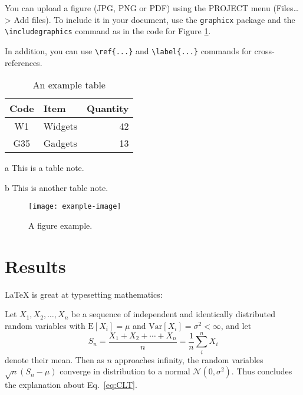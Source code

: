 \documentclass{biophys-new}
\begin{document}
You can upload a figure (JPG, PNG or PDF) using the PROJECT menu (Files\ldots > Add files). To include it in your document, use the \verb|graphicx| package and the \verb|\includegraphics| command as in the code for Figure \ref{fig:view}. 

In addition, you can use \verb|\ref{...}| and \verb|\label{...}| commands for cross-references.

\begin{table}[hbt!]
\caption{An example table}
\label{tab:widgets}
\centering

\begin{threeparttable}

\begin{tabular}{c l r}
\hline
Code & Item & Quantity \\\hline
W1 & Widgets\tnote{a} & 42 \\
G35 & Gadgets & 13\tnote{b} \\
\hline
\end{tabular}

\begin{tablenotes}
\item[a] This is a table note.
\item[b] This is another table note.
\end{tablenotes}

\end{threeparttable}

\end{table}

\begin{figure}[hbt!]
\centering
\texttt{[image: example-image]}
\caption{A figure example.}
\label{fig:view}

\end{figure}

\section*{Results}

\LaTeX{} is great at typesetting mathematics:

Let $X_1, X_2, \ldots, X_n$ be a sequence of independent and identically distributed random variables with $\text{E}[X_i] = \mu$ and $\text{Var}[X_i] = \sigma^2 < \infty$, and let
\begin{equation}
\label{eq:CLT}
S_n = \frac{X_1 + X_2 + \cdots + X_n}{n}
      = \frac{1}{n}\sum_{i}^{n} X_i
\end{equation}
denote their mean. Then as $n$ approaches infinity, the random variables $\sqrt{n}(S_n - \mu)$ converge in distribution to a normal $\mathcal{N}(0, \sigma^2)$. Thus concludes the explanation about Eq.~\ref{eq:CLT}.
\end{document}
